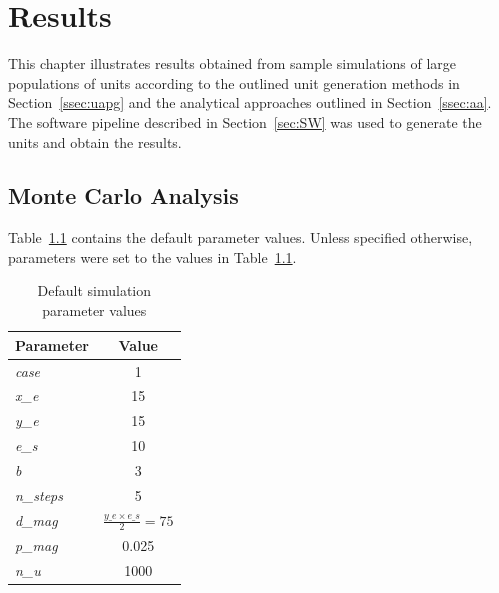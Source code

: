 \chapter{Results}
\label{chp:R}


This chapter illustrates results obtained from sample simulations of large populations of units according to the outlined unit generation methods in Section~\ref{ssec:uapg} and the analytical approaches outlined in Section~\ref{ssec:aa}. The software pipeline described in Section~\ref{sec:SW} was used to generate the units and obtain the results.

\section{Monte Carlo Analysis}

Table~\ref{tab:defpar} contains the default parameter values. Unless specified otherwise, parameters were set to the values in Table~\ref{tab:defpar}.

\begin{table}[H]
\centering
\caption{Default simulation parameter values}
\label{tab:defpar}
\begin{tabular}{@{}lc@{}}
\toprule
\multicolumn{1}{c}{\textbf{Parameter}} & \textbf{Value}                 \\ \midrule
\textit{case}                          & 1                              \\
\textit{x\_e}                          & 15                             \\
\textit{y\_e}                          & 15                             \\
\textit{e\_s}                          & 10                             \\
\textit{b}                             & 3                              \\
\textit{n\_steps}                      & 5                              \\
\textit{d\_mag}                        & $\frac{y\_e\times e\_s}{2}=75$ \\
\textit{p\_mag}                        & 0.025                          \\
\textit{n\_u}                          & 1000                           \\ \bottomrule
\end{tabular}
\end{table}


